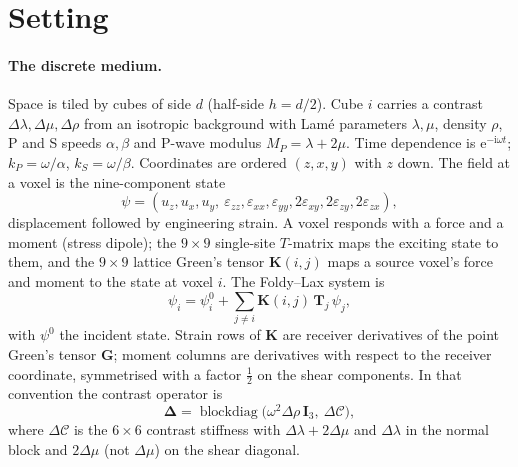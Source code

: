\documentclass[extra,mreferee]{gji}
\newcommand{\bI}{\mathbf{I}}
\newcommand{\bT}{\mathbf{T}}
\newcommand{\bK}{\mathbf{K}}
\newcommand{\bD}{\boldsymbol{\Delta}}
\newcommand{\bG}{\mathbf{G}}
\begin{document}
\section{Setting}\label{sec:setting}

\paragraph{The discrete medium.} Space is tiled by cubes of side $d$ (half-side $h=d/2$). Cube $i$
carries a contrast $\Delta\lambda,\Delta\mu,\Delta\rho$ from an isotropic background with Lamé
parameters $\lambda,\mu$, density $\rho$, P and S speeds $\alpha,\beta$ and P-wave modulus
$M_P=\lambda+2\mu$. Time dependence is $\mathrm{e}^{-\mathrm{i}\omega t}$; $k_P=\omega/\alpha$, $k_S=\omega/\beta$.
Coordinates are ordered $(z,x,y)$ with $z$ down. The field at a voxel is the nine-component state
\begin{equation}
  \psi=(u_z,u_x,u_y,\ \varepsilon_{zz},\varepsilon_{xx},\varepsilon_{yy},
  2\varepsilon_{xy},2\varepsilon_{zy},2\varepsilon_{zx}),
\end{equation}
displacement followed by engineering strain. A voxel responds with a force and a moment (stress
dipole); the $9\times9$ single-site $T$-matrix maps the exciting state to them, and the $9\times9$
lattice Green's tensor $\bK(i,j)$ maps a source voxel's force and moment to the state at voxel $i$.
The Foldy--Lax system is
\begin{equation}\label{eq:foldylax}
  \psi_i=\psi^0_i+\sum_{j\neq i}\bK(i,j)\,\bT_j\,\psi_j ,
\end{equation}
with $\psi^0$ the incident state. Strain rows of $\bK$ are receiver derivatives of the point
Green's tensor $\bG$; moment columns are derivatives with respect to the receiver coordinate,
symmetrised with a factor $\tfrac12$ on the shear components. In that convention the contrast
operator is
\begin{equation}\label{eq:delta}
  \bD=\operatorname{blockdiag}\!\bigl(\omega^2\Delta\rho\,\bI_3,\ \Delta\mathcal{C}\bigr),
\end{equation}
where $\Delta\mathcal{C}$ is the $6\times6$ contrast stiffness with $\Delta\lambda+2\Delta\mu$ and
$\Delta\lambda$ in the normal block and $2\Delta\mu$ (not $\Delta\mu$) on the shear diagonal.
\end{document}
